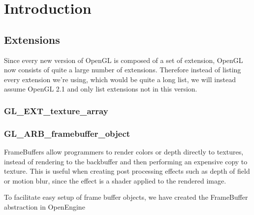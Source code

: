 \chapter{Introduction}


\section{Extensions}

Since every new version of OpenGL is composed of a set of extension,
OpenGL now consists of quite a large number of extensions. Therefore
instead of listing every extension we're using, which would be quite a
long list, we will instead assume OpenGL 2.1 and only list extensions
not in this version.

\subsection{GL\_EXT\_texture\_array}


\subsection{GL\_ARB\_framebuffer\_object}

FrameBuffers allow programmers to render colors or depth directly to
textures, instead of rendering to the backbuffer and then performing
an expensive copy to texture. This is useful when creating post
processing effects such as depth of field or motion blur, since the
effect is a shader applied to the rendered image.


To facilitate easy setup of frame buffer objects, we have created the
FrameBuffer abstraction in OpenEngine



